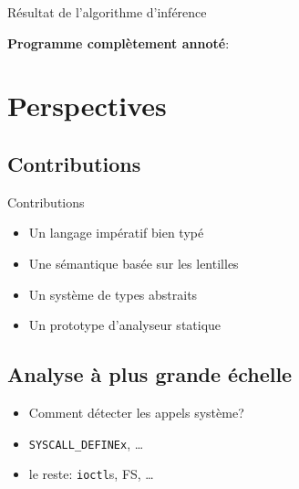 \documentclass{beamer}
\def\codeout#1{
    \begin{center}
    \fboxsep=2mm
    \colorbox{codeoutcol}{\BUseVerbatim{#1}}
    \end{center}
}
\begin{document}
\begin{frame}[fragile]{Résultat de l'algorithme d'inférence}

\textbf{Programme complètement annoté}:


\codeout{drmok}
\end{frame}

\section{Perspectives}

\subsection{Contributions}

\begin{frame}{Contributions}
\begin{itemize}
\item Un langage impératif bien typé
\item Une sémantique basée sur les lentilles
\item Un système de types abstraits
\item Un prototype d'analyseur statique
\end{itemize}
\end{frame}

\subsection{Analyse à plus grande échelle}

\begin{frame}
    \begin{itemize}
        \item Comment détecter les appels système?
        \item \texttt{SYSCALL\_DEFINEx}, …
        \item le reste: \texttt{ioctl}s, FS, …
    \end{itemize}
\end{frame}
\end{document}
